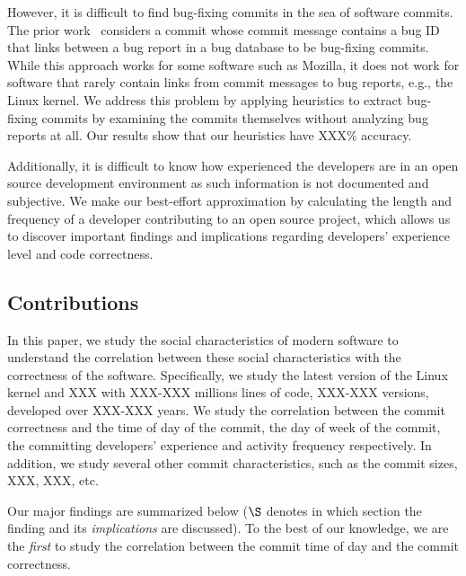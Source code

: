 However, it is difficult to find bug-fixing commits in the sea of software commits.
The prior work~\cite{2005-changes} considers a commit whose commit message contains a bug 
ID that links between a bug report in a bug database to be bug-fixing commits. While this
approach works for some software such as Mozilla, it does not work for software that 
rarely contain links from commit messages to bug reports, e.g., the Linux kernel.
We address this problem by applying heuristics to extract bug-fixing commits by examining
the commits themselves without analyzing bug reports at all. Our results show that our
heuristics have XXX\% accuracy.  

Additionally, it is difficult to know how experienced the developers are in an open source development
environment as such information is not documented and subjective. 
We make our best-effort approximation by calculating the length and frequency of a developer
contributing to an open source project, which allows us to discover important findings 
and implications regarding developers' experience level and code correctness. 

\subsection{Contributions}
In this paper, we study the social characteristics of modern software to understand 
the correlation between these social characteristics with the correctness of the software.  
Specifically, we study the latest version of the Linux kernel and XXX with XXX-XXX millions lines 
of code, XXX-XXX versions, developed over XXX-XXX years. We study the correlation between 
the commit correctness and the time of day of the commit, the day of week of the commit, 
the committing developers' experience and activity frequency respectively.  
In addition, we study several other commit characteristics, such as
the commit sizes, XXX, XXX, etc. 

Our major findings 
are summarized below ($\S$ denotes in which
section the finding and its {\em implications} are discussed). To the best of our
knowledge, we are the {\em first} to study the correlation between the commit time of day and
the commit correctness. 

